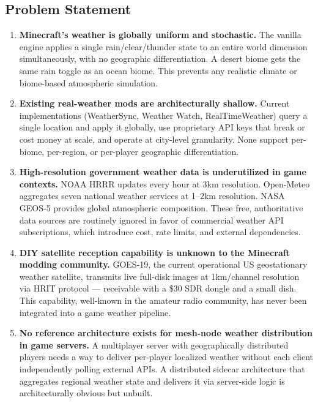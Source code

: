 \documentclass[11pt,letterpaper]{article}
\begin{document}
\subsection{Problem Statement}

\begin{enumerate}
  \item \textbf{Minecraft's weather is globally uniform and stochastic.} The vanilla engine applies a single rain/clear/thunder state to an entire world dimension simultaneously, with no geographic differentiation. A desert biome gets the same rain toggle as an ocean biome. This prevents any realistic climate or biome-based atmospheric simulation.

  \item \textbf{Existing real-weather mods are architecturally shallow.} Current implementations (WeatherSync, Weather Watch, RealTimeWeather) query a single location and apply it globally, use proprietary API keys that break or cost money at scale, and operate at city-level granularity. None support per-biome, per-region, or per-player geographic differentiation.

  \item \textbf{High-resolution government weather data is underutilized in game contexts.} NOAA HRRR updates every hour at 3km resolution. Open-Meteo aggregates seven national weather services at 1--2km resolution. NASA GEOS-5 provides global atmospheric composition. These free, authoritative data sources are routinely ignored in favor of commercial weather API subscriptions, which introduce cost, rate limits, and external dependencies.

  \item \textbf{DIY satellite reception capability is unknown to the Minecraft modding community.} GOES-19, the current operational US geostationary weather satellite, transmits live full-disk images at 1km/channel resolution via HRIT protocol --- receivable with a \$30 SDR dongle and a small dish. This capability, well-known in the amateur radio community, has never been integrated into a game weather pipeline.

  \item \textbf{No reference architecture exists for mesh-node weather distribution in game servers.} A multiplayer server with geographically distributed players needs a way to deliver per-player localized weather without each client independently polling external APIs. A distributed sidecar architecture that aggregates regional weather state and delivers it via server-side logic is architecturally obvious but unbuilt.
\end{enumerate}
\end{document}
